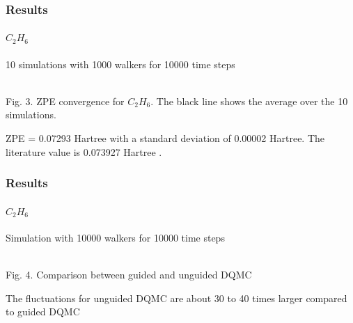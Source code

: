 \documentclass[16pt]{beamer}
\begin{document}
\begin{frame}
\frametitle{Results}
\framesubtitle{$C_2 H_6$}
10 simulations with 1000 walkers for 10000 time steps
\begin{center}
\\
Fig. 3. ZPE convergence for $C_2 H_6$. The black line shows the average over the 10 simulations.
\end{center}
ZPE = 0.07293 Hartree with a standard deviation of 0.00002 Hartree. The literature value is 0.073927 Hartree \cite{c2h6}.\\

\end{frame}

\begin{frame}
\frametitle{Results}
\framesubtitle{$C_2 H_6$}
Simulation with 10000 walkers for 10000 time steps
\begin{center}
\\
Fig. 4. Comparison between guided and unguided DQMC
\end{center}
The fluctuations for unguided DQMC are about 30 to 40 times larger compared to guided DQMC
\end{frame}
\end{document}
